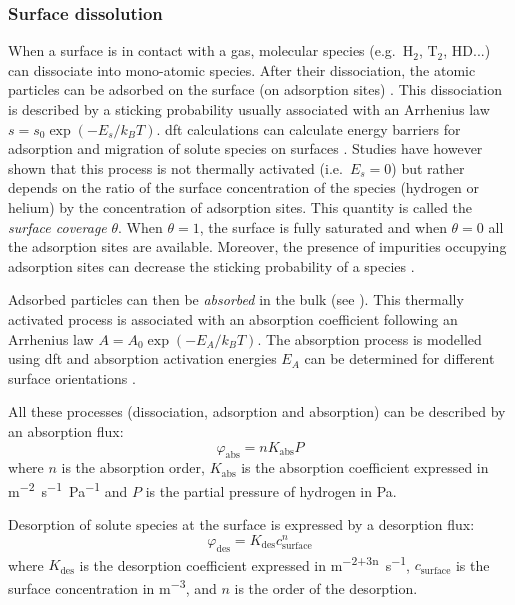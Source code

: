 \subsubsection{Surface dissolution}

When a surface is in contact with a gas, molecular species (e.g.\ $\text{H}_2$, $\text{T}_2$, $\text{HD}$...) can dissociate into mono-atomic species.
After their dissociation, the atomic particles can be adsorbed on the surface (on adsorption sites) .
This dissociation is described by a sticking probability usually associated with an Arrhenius law $s = s_0 \exp{(-E_s/k_B T)}$.
\gls{dft} calculations can calculate energy barriers for adsorption and migration of solute species on surfaces .
Studies have however shown that this process is not thermally activated (i.e.\ $E_s=0$)  but rather depends on the ratio of the surface concentration of the species (hydrogen or helium) by the concentration of adsorption sites.
This quantity is called the \textit{surface coverage} $\theta$. 
When $\theta = 1$, the surface is fully saturated and when $\theta = 0$ all the adsorption sites are available.
Moreover, the presence of impurities occupying adsorption sites can decrease the sticking probability of a species .

Adsorbed particles can then be \textit{absorbed} in the bulk (see ).
This thermally activated process is associated with an absorption coefficient following an Arrhenius law $A=A_0 \exp{(-E_A/k_B T)}$.
The absorption process is modelled using \gls{dft} and absorption activation energies $E_A$ can be determined for different surface orientations .

All these processes (dissociation, adsorption and absorption) can be described by an absorption flux:
\begin{equation}
    \varphi_\mathrm{abs} = n K_\mathrm{abs} P
\end{equation}
where $n$ is the absorption order, $K_\mathrm{abs}$ is the absorption coefficient expressed in \si{m^{-2}.s^{-1}.Pa^{-1}} and $P$ is the partial pressure of hydrogen in \si{Pa}.

Desorption of solute species at the surface is expressed by a desorption flux:
\begin{equation}
    \varphi_\mathrm{des} = K_\mathrm{des} c_\mathrm{surface}^n
\end{equation}
where $K_\mathrm{des}$ is the desorption coefficient expressed in \si{m^{-2+3n}.s^{-1}}, $c_\mathrm{surface}$ is the surface concentration in \si{m^{-3}}, and $n$ is the order of the desorption.

